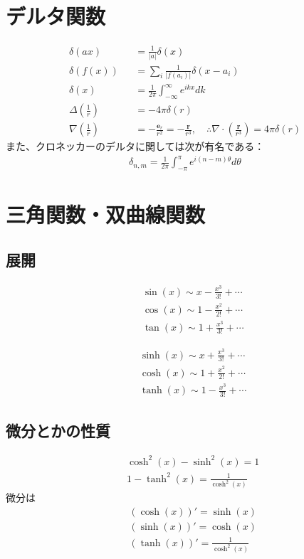 \documentclass[12pt,dvipdfmx]{jsarticle}
\begin{document}
\section*{\Large{デルタ関数}}
\begin{eqnarray}
  \delta(ax) &&= \frac{1}{|a|}\delta(x)\\
  \delta(f(x)) &&= \sum_i \frac{1}{|f(a_i)|}\delta(x-a_i)\\
  \delta(x) &&= \frac{1}{2\pi}\int_{-\infty}^{\infty} e^{ikx}dk\\
  \Delta\left( \frac{1}{r} \right) &&= -4\pi\delta(r)\\
  \nabla\left( \frac{1}{r} \right) &&= -\frac{\bm{e}_r}{r^2} = -\frac{\bm{r}}{r^3},\quad\therefore \nabla\cdot\left( \frac{\bm{r}}{r^3} \right) = 4\pi\delta(r)
\end{eqnarray}
また、クロネッカーのデルタに関しては次が有名である：
\begin{eqnarray}
  \delta_{n,m} = \frac{1}{2\pi}\int_{-\pi}^{\pi}e^{i(n-m)\theta}d\theta
\end{eqnarray}
\section*{\Large{三角関数・双曲線関数}}
\subsection*{展開}
\begin{eqnarray}
  &&\sin(x) \sim x-\frac{x^3}{3!}+\cdots\\
  &&\cos(x) \sim 1-\frac{x^2}{2!}+\cdots\\
  &&\tan(x) \sim 1+\frac{x^3}{3!}+\cdots
\end{eqnarray}

\begin{eqnarray}
  &&\sinh(x) \sim x+\frac{x^3}{3!}+\cdots\\
  &&\cosh(x) \sim 1+\frac{x^2}{2!}+\cdots\\
  &&\tanh(x) \sim 1-\frac{x^3}{3!}+\cdots
\end{eqnarray}
\subsection*{微分とかの性質}
\begin{eqnarray}
  &&\cosh^2(x)-\sinh^2(x)=1\\
  &&1-\tanh^2(x) =\frac{1}{\cosh^2(x)}
\end{eqnarray}
微分は
\begin{eqnarray}
  &&\left(\cosh(x)\right)' = \sinh(x)\\
  &&\left(\sinh(x)\right)' = \cosh(x)\\
  &&\left(\tanh(x)\right)' = \frac{1}{\cosh^2(x)}
\end{eqnarray}
\end{document}
